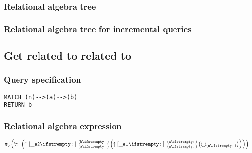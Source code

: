\subsubsection*{Relational algebra tree}


\subsubsection*{Relational algebra tree for incremental queries}


\subsection{Get related to related to}

\subsubsection*{Query specification}

\begin{lstlisting}
MATCH (n)-->(a)-->(b)
RETURN b
\end{lstlisting}

\subsubsection*{Relational algebra expression}

$\projection{\var{b}} \left(\alldifferent{} \left(\expandout{\_e2}{}{a}{b}{} \left(\expandout{\_e1}{}{n}{a}{} \left(\getvertices{n}{}\right)\right)\right)\right)$

